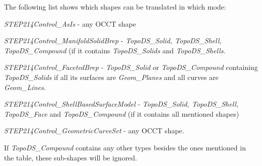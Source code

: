 The following list shows which shapes can be translated in which mode\+:
\begin{DoxyItemize}
\item {\itshape S\+T\+E\+P214\+Control\+\_\+\+As\+Is} -\/ any O\+C\+CT shape
\item {\itshape S\+T\+E\+P214\+Control\+\_\+\+Manifold\+Solid\+Brep} -\/ {\itshape Topo\+D\+S\+\_\+\+Solid, Topo\+D\+S\+\_\+\+Shell, Topo\+D\+S\+\_\+\+Compound} (if it contains {\itshape Topo\+D\+S\+\_\+\+Solids} and {\itshape Topo\+D\+S\+\_\+\+Shells}.
\item {\itshape S\+T\+E\+P214\+Control\+\_\+\+Faceted\+Brep} -\/ {\itshape Topo\+D\+S\+\_\+\+Solid} or {\itshape Topo\+D\+S\+\_\+\+Compound} containing {\itshape Topo\+D\+S\+\_\+\+Solids} if all its surfaces are {\itshape Geom\+\_\+\+Planes} and all curves are {\itshape Geom\+\_\+\+Lines}.
\item {\itshape S\+T\+E\+P214\+Control\+\_\+\+Shell\+Based\+Surface\+Model} -\/ {\itshape Topo\+D\+S\+\_\+\+Solid, Topo\+D\+S\+\_\+\+Shell, Topo\+D\+S\+\_\+\+Face} and {\itshape Topo\+D\+S\+\_\+\+Compound} (if it contains all mentioned shapes)
\item {\itshape S\+T\+E\+P214\+Control\+\_\+\+Geometric\+Curve\+Set} -\/ any O\+C\+CT shape.
\end{DoxyItemize}

If {\itshape Topo\+D\+S\+\_\+\+Compound} contains any other types besides the ones mentioned in the table, these sub-\/shapes will be ignored.

